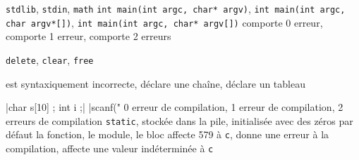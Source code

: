 \documentclass[10pt]{article}
\begin{document}
\begin{center}
\begin{alterqcm}[lq=90mm,title,num=true,alea,long]
{{\texttt{stdlib}},
 {\texttt{stdin}},
 {\texttt{math}}}
{{\texttt{int main(int argc, char* argv)}},
 {\texttt{int main(int argc, char argv*[])}},
 {\texttt{int main(int argc, char* argv[])}}}
{{comporte 0 erreur},
 {comporte 1 erreur},
 {comporte 2 erreurs}}

{{\texttt{delete}},
 {\texttt{clear}},
 {\texttt{free}}}

{{est syntaxiquement incorrecte},
 {déclare une chaîne},
 {déclare un tableau}}

\verbdef\arga|char s[10] ; int i ;|
\verbdef\argb|scanf("%
{{0 erreur de compilation},
 {1 erreur de compilation},
 {2 erreurs de compilation}}
{{\texttt{static}},
 {stockée dans la pile},
 {initialisée avec des zéros par défaut}}
{{la fonction},
 {le module},
 {le bloc}}
{{affecte 579 à \texttt{c}},
 {donne une erreur à la compilation},
 {affecte une valeur indéterminée à \texttt{c}}}
\end{alterqcm}
\end{center}
\end{document}
